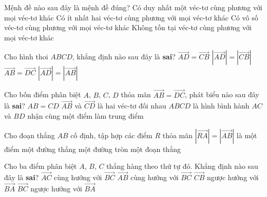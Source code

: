 \begin{ex}%
	Mệnh đề nào sau đây là mệnh đề đúng?	
	\choice
	{\True Có duy nhất một véc-tơ cùng phương với mọi véc-tơ khác}
	{Có ít nhất hai véc-tơ cùng phương với mọi véc-tơ khác}
	{Có vô số véc-tơ cùng phương với mọi véc-tơ khác}
	{Không tồn tại véc-tơ cùng phương với mọi véc-tơ khác}
\end{ex}
\begin{ex}%
	Cho hình thoi $ABCD$, khẳng định nào sau đây là \textbf{sai}?	
	\choice
	{\True $\vec{AD}=\vec{CB}$}
	{$\left|\vec{AD}\right|=\left|\vec{CB}\right|$}
	{$\vec{AB}=\vec{DC}$}
	{$\left|\vec{AD}\right|=\left|\vec{AB}\right|$}
\end{ex}
\begin{ex}%
	Cho bốn điểm phân biệt $A$, $B$, $C$, $D$ thỏa mãn $\vec{AB}=\vec{DC}$, phát biểu nào sau đây là \textbf{sai}?
	\choice
	{$AB=CD$}
	{$\vec{AB}$ và $\vec{CD}$ là hai véc-tơ đối nhau}
	{\True $ABCD$ là hình bình hành}
	{$AC$ và $BD$ nhận cùng một điểm làm trung điểm}
\end{ex}
\begin{ex}%
	Cho đoạn thẳng $AB$ cố định, tập hợp các điểm $R$ thỏa mãn $\left|\vec{RA}\right|=\left|\vec{AB}\right|$ là	
	\choice
	{một điểm}
	{một đường thẳng}
	{\True một đường tròn}
	{một đoạn thẳng}
\end{ex}
\begin{ex}%
	Cho ba điểm phân biệt $A$, $B$, $C$ thẳng hàng theo thứ tự đó. Khẳng định nào sau đây là \textbf{sai}?	
	\choice
	{$\vec{AC}$ cùng hướng với $\vec{BC}$}
	{$\vec{AB}$ cùng hướng với $\vec{BC}$}
	{\True $\vec{CB}$ ngược hướng với $\vec{BA}$}
	{$\vec{BC}$ ngược hướng với $\vec{BA}$}
\end{ex}
